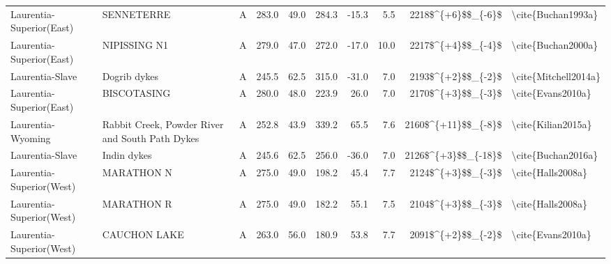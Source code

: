 \begin{longtable}{p{1 in}p{1 in}rrrrrrr}
      Laurentia-Superior(East) &                                         SENNETERRE &      A &     283.0 &      49.0 & 284.3 & -15.3 &       5.5 &     2218\$\textasciicircum \{+6\}\$\$\_\{-6\}\$ &                                 \textbackslash cite\{Buchan1993a\} \\
      Laurentia-Superior(East) &                                       NIPISSING N1 &      A &     279.0 &      47.0 & 272.0 & -17.0 &      10.0 &     2217\$\textasciicircum \{+4\}\$\$\_\{-4\}\$ &                                 \textbackslash cite\{Buchan2000a\} \\
               Laurentia-Slave &                                       Dogrib dykes &      A &     245.5 &      62.5 & 315.0 & -31.0 &       7.0 &     2193\$\textasciicircum \{+2\}\$\$\_\{-2\}\$ &                               \textbackslash cite\{Mitchell2014a\} \\
      Laurentia-Superior(East) &                                        BISCOTASING &      A &     280.0 &      48.0 & 223.9 &  26.0 &       7.0 &     2170\$\textasciicircum \{+3\}\$\$\_\{-3\}\$ &                                  \textbackslash cite\{Evans2010a\} \\
             Laurentia-Wyoming &    Rabbit Creek, Powder River and South Path Dykes &      A &     252.8 &      43.9 & 339.2 &  65.5 &       7.6 &    2160\$\textasciicircum \{+11\}\$\$\_\{-8\}\$ &                                 \textbackslash cite\{Kilian2015a\} \\
               Laurentia-Slave &                                        Indin dykes &      A &     245.6 &      62.5 & 256.0 & -36.0 &       7.0 &    2126\$\textasciicircum \{+3\}\$\$\_\{-18\}\$ &                                 \textbackslash cite\{Buchan2016a\} \\
      Laurentia-Superior(West) &                                         MARATHON N &      A &     275.0 &      49.0 & 198.2 &  45.4 &       7.7 &     2124\$\textasciicircum \{+3\}\$\$\_\{-3\}\$ &                                  \textbackslash cite\{Halls2008a\} \\
      Laurentia-Superior(West) &                                         MARATHON R &      A &     275.0 &      49.0 & 182.2 &  55.1 &       7.5 &     2104\$\textasciicircum \{+3\}\$\$\_\{-3\}\$ &                                  \textbackslash cite\{Halls2008a\} \\
      Laurentia-Superior(West) &                                       CAUCHON LAKE &      A &     263.0 &      56.0 & 180.9 &  53.8 &       7.7 &     2091\$\textasciicircum \{+2\}\$\$\_\{-2\}\$ &                                  \textbackslash cite\{Evans2010a\} \\

\end{longtable}
